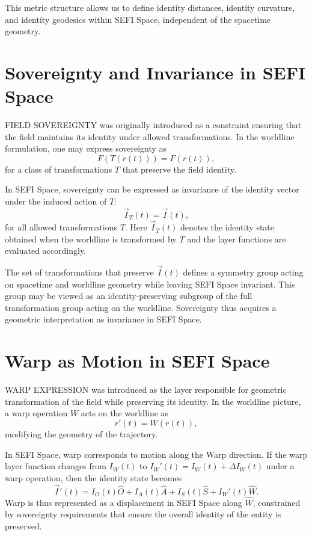 \documentclass[12pt]{article}
\begin{document}
This metric structure allows us to define identity distances, identity curvature, and identity geodesics
within SEFI Space, independent of the spacetime geometry.

\section{Sovereignty and Invariance in SEFI Space}

FIELD SOVEREIGNTY was originally introduced as a constraint ensuring that the field maintains its identity
under allowed transformations. In the worldline formulation, one may express sovereignty as
\begin{equation}
F(T(r(t))) = F(r(t)),
\end{equation}
for a class of transformations $T$ that preserve the field identity.

In SEFI Space, sovereignty can be expressed as invariance of the identity vector under the induced action
of $T$:
\begin{equation}
\vec{I}_T(t) = \vec{I}(t),
\end{equation}
for all allowed transformations $T$. Here $\vec{I}_T(t)$ denotes the identity state obtained when the
worldline is transformed by $T$ and the layer functions are evaluated accordingly.

The set of transformations that preserve $\vec{I}(t)$ defines a symmetry group acting on spacetime and
worldline geometry while leaving SEFI Space invariant. This group may be viewed as an identity-preserving
subgroup of the full transformation group acting on the worldline. Sovereignty thus acquires a geometric
interpretation as invariance in SEFI Space.

\section{Warp as Motion in SEFI Space}

WARP EXPRESSION was introduced as the layer responsible for geometric transformation of the field while
preserving its identity. In the worldline picture, a warp operation $W$ acts on the worldline as
\begin{equation}
r'(t) = W(r(t)),
\end{equation}
modifying the geometry of the trajectory.

In SEFI Space, warp corresponds to motion along the Warp direction. If the warp layer function changes
from $I_W(t)$ to $I_W'(t) = I_W(t) + \Delta I_W(t)$ under a warp operation, then the identity state becomes
\begin{equation}
\vec{I}'(t) = I_O(t) \hat{O} + I_A(t) \hat{A} + I_S(t) \hat{S} + I_W'(t) \hat{W}.
\end{equation}
Warp is thus represented as a displacement in SEFI Space along $\hat{W}$, constrained by sovereignty
requirements that ensure the overall identity of the entity is preserved.
\end{document}
